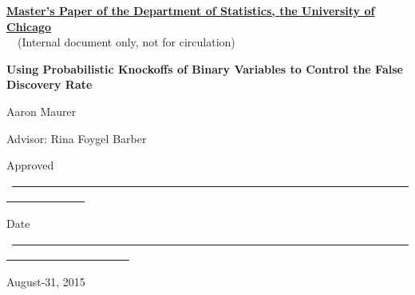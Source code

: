 \documentclass[11pt]{article}
\theoremstyle{definition}
\begin{document}
\noindent
\thispagestyle{empty}
\underline{\bf Master's Paper of the Department of Statistics, the University of Chicago} 
    \\~~(Internal document only, not for circulation) 

\vspace{1.8in}
\begin{center}
    {\bf\LARGE Using Probabilistic Knockoffs of Binary Variables to Control the False Discovery Rate}

    \vspace{1.4in}
    {\Large Aaron Maurer}

    \vspace{1.3in}
    {\Large Advisor: Rina Foygel Barber }

\end{center}

\vspace{.6in}
{\Large Approved} ~\underline{~~~~~~~~~~~~~~~~~~~~~~~~~~~~~~~~~~~~~~~~~~~~~~~~~~~~~~~~~~~~~~~~~~~~~~~~~~~~~~~~~~~~~}

\vspace{.2in}
{\Large Date} ~\underline{~~~~~~~~~~~~~~~~~~~~~~~~~~~~~~~~~~~~~~~~~~~~~~~~~~~~~~~~~~~~~~~~~~~~~~~~~~~~~~~~~~~~~~~~~~~~~}

\vfill
\begin{center}{\large August-31, 2015}\end{center}

\newpage
\pagestyle{plain}
\setcounter{page}{1}

\begin{abstract}

    \vspace{7mm}\noindent  Variable selection for regression is a key problem in applied statistics. The knockoff filter method provides one method of variable selection for linear regression. It relies on generating `knockoff' features, which replicate the correlation structure of the original variable; when the full path of LASSO regression is fit, the point at which a null variable and its knockoff have nonzero coefficients will be exchangeable. However, for other GLMs, the method breaks down. I will provide an alternative method of randomly generating knockoffs for binary variables which will will satisfy the original correlation condition in expectation and offer improved performance for other GLMs. \end{abstract}

\newpage
\vspace{1.5in}
\tableofcontents
\end{document}
